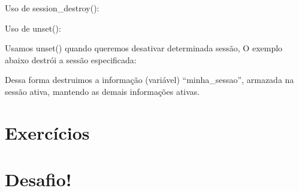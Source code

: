 Uso de session_destroy():



Uso de unset():

Usamos unset() quando queremos desativar determinada sessão, O exemplo abaixo destrói a sessão especificada:



Dessa forma destruimos a informação (variável) “minha_sessao”, armazada na sessão ativa, mantendo as demais informações ativas.



\section{Exercícios}
\label{cap9-exercicios}

\section{Desafio!}
\label{cap9-desafio}